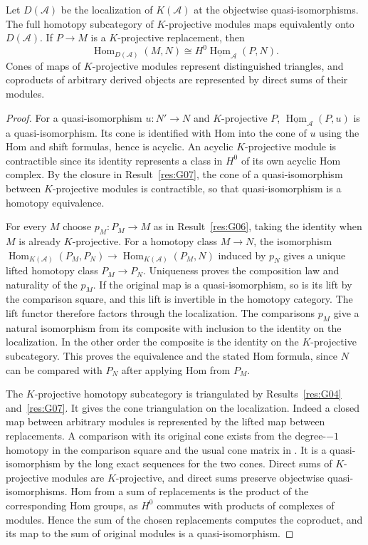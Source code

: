 \begin{theorem}\label{res:G08}
Let \(D(\mathcal A)\) be the localization of \(K(\mathcal A)\)
at the objectwise quasi-isomorphisms. The full homotopy subcategory
of \(K\)-projective modules maps equivalently onto \(D(\mathcal A)\).
If \(P\to M\) is a \(K\)-projective replacement, then
\[
 \operatorname{Hom}_{D(\mathcal A)}(M,N)
      \cong H^0\underline{\operatorname{Hom}}_{\mathcal A}(P,N).
\]
Cones of maps of \(K\)-projective modules represent distinguished
triangles, and coproducts of arbitrary derived objects are
represented by direct sums of their modules.
\end{theorem}
\begin{proof}
For a quasi-isomorphism \(u:N'\to N\) and \(K\)-projective \(P\),
\(\underline{\operatorname{Hom}}_{\mathcal A}(P,u)\) is a
quasi-isomorphism. Its cone is identified with Hom into the cone
of \(u\) using the Hom and shift formulas, hence is acyclic.
An acyclic \(K\)-projective module is contractible since its
identity represents a class in \(H^0\) of its own acyclic Hom
complex. By the closure in Result~\ref{res:G07}, the cone of a
quasi-isomorphism between \(K\)-projective modules is contractible,
so that quasi-isomorphism is a homotopy equivalence.

For every \(M\) choose \(p_M:P_M\to M\) as in Result~\ref{res:G06},
taking the identity when \(M\) is already \(K\)-projective.
For a homotopy class \(M\to N\), the isomorphism
\(\operatorname{Hom}_{K(\mathcal A)}(P_M,P_N)\to
  \operatorname{Hom}_{K(\mathcal A)}(P_M,N)\)
induced by \(p_N\) gives a unique lifted homotopy class
\(P_M\to P_N\). Uniqueness proves the composition law and
naturality of the \(p_M\). If the original map is a quasi-isomorphism,
so is its lift by the comparison square, and this lift is
invertible in the homotopy category. The lift functor therefore
factors through the localization. The comparisons \(p_M\) give a
natural isomorphism from its composite with inclusion to the
identity on the localization. In the other order the composite
is the identity on the \(K\)-projective subcategory. This proves
the equivalence and the stated Hom formula, since \(N\) can be
compared with \(P_N\) after applying Hom from \(P_M\).

The \(K\)-projective homotopy subcategory is triangulated by
Results~\ref{res:G04} and~\ref{res:G07}. It gives the cone
triangulation on the localization. Indeed a closed map between
arbitrary modules is represented by the lifted map between
replacements. A comparison with its original cone exists from
the degree-\(-1\) homotopy in the comparison square and the
usual cone matrix in \cite[K05]{ha-core}. It is a quasi-isomorphism
by the long exact sequences for the two cones. Direct sums of
\(K\)-projective modules are \(K\)-projective, and direct sums preserve
objectwise quasi-isomorphisms. Hom from a sum of replacements is
the product of the corresponding Hom groups, as \(H^0\) commutes
with products of complexes of modules. Hence the sum of the
chosen replacements computes the coproduct, and its map to the
sum of original modules is a quasi-isomorphism.
\end{proof}

